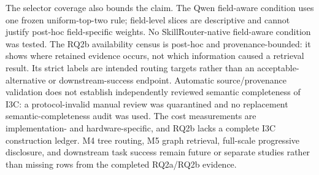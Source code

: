 The selector coverage also bounds the claim. The Qwen field-aware condition uses one frozen uniform-top-two rule; field-level slices are descriptive and cannot justify post-hoc field-specific weights. No SkillRouter-native field-aware condition was tested. The RQ2b availability census is post-hoc and provenance-bounded: it shows where retained evidence occurs, not which information caused a retrieval result. Its strict labels are intended routing targets rather than an acceptable-alternative or downstream-success endpoint. Automatic source/provenance validation does not establish independently reviewed semantic completeness of I3C: a protocol-invalid manual review was quarantined and no replacement semantic-completeness audit was used. The cost measurements are implementation- and hardware-specific, and RQ2b lacks a complete I3C construction ledger. M4 tree routing, M5 graph retrieval, full-scale progressive disclosure, and downstream task success remain future or separate studies rather than missing rows from the completed RQ2a/RQ2b evidence.
